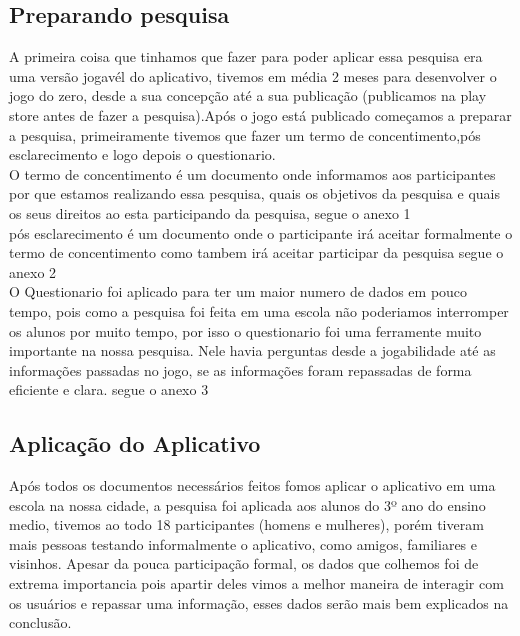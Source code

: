 \documentclass[12pt]{article}
\begin{document}
	\subsection{Preparando pesquisa} %
		A primeira coisa que tinhamos que fazer para poder aplicar essa pesquisa era uma versão jogavél do aplicativo, tivemos em média 2 meses para desenvolver o jogo do zero, desde a sua concepção até a sua publicação (publicamos na play store antes de fazer a pesquisa).Após o jogo está publicado começamos a preparar a pesquisa, primeiramente tivemos que fazer um termo de concentimento,pós esclarecimento e logo depois o questionario.\\
		
		O termo de concentimento é um documento onde informamos aos participantes por que estamos realizando essa pesquisa, quais os objetivos da pesquisa e quais os seus direitos ao esta participando da pesquisa, segue o anexo 1 \\
		
		pós esclarecimento é um documento onde o participante irá aceitar formalmente o termo de concentimento como tambem irá aceitar participar da pesquisa segue o anexo 2 \\
		
		O Questionario foi aplicado para ter um maior numero de dados em pouco tempo, pois como a pesquisa foi feita em uma escola não poderiamos interromper os alunos por muito tempo, por isso o questionario foi uma ferramente muito importante na nossa pesquisa. Nele havia perguntas desde a jogabilidade até as informações passadas no jogo, se as informações foram repassadas de forma eficiente e clara. segue o anexo 3\\
		
	
	\subsection{Aplicação do Aplicativo}%
		Após todos os documentos necessários feitos fomos aplicar o aplicativo em uma escola na nossa cidade, a pesquisa foi aplicada aos alunos do 3º ano do ensino medio, tivemos ao todo 18 participantes (homens e mulheres), porém tiveram mais pessoas testando informalmente o aplicativo, como amigos, familiares e visinhos. Apesar da pouca participação formal, os dados que colhemos foi de extrema importancia pois apartir deles vimos a melhor maneira de interagir com os usuários e repassar uma informação, esses dados serão mais bem explicados na conclusão.\\
		
\end{document}
